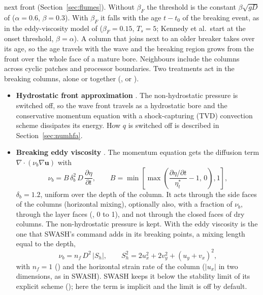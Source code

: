 next front (Section~\ref{sec:flumes}).
Without $\beta_F$ the threshold is the constant $\beta\sqrt{gD}$ of
\citet{smit2013} ($\alpha = 0.6$, $\beta = 0.3$). With $\beta_F$ it falls with
the age $t-t_0$ of the breaking event, as in the eddy-viscosity model of
\citet{kennedy2000} ($\beta_F = 0.15$, $T_s = 5$; Kennedy et al.\ start at the
onset threshold, $\beta = \alpha$). A column that joins next to an older
breaker takes over its age, so the age travels with the wave and the
breaking region grows from the front over the whole face of a mature bore.
Neighbours include the columns across cyclic patches and processor
boundaries. Two treatments act in
the breaking columns, alone or together (,
 or ).
\begin{itemize}[nosep]
  \item \textbf{Hydrostatic front approximation} \citep{smit2013}. The
        non-hydrostatic pressure is switched off, so the wave front travels as
        a hydrostatic bore and the conservative momentum equation with a
        shock-capturing (TVD) convection scheme dissipates its energy. How $q$
        is switched off is described in Section~\ref{sec:numhfa}.
  \item \textbf{Breaking eddy viscosity} \citep{kennedy2000}. The momentum
        equation gets the diffusion term $\nabla\cdot(\nu_b\nabla\bm{u})$ with
        \begin{equation}
        \nu_b = B\,\delta_b^2\,D\,\frac{\partial\eta}{\partial t},\qquad
        B = \min\!\left[\max\!\left(\frac{\partial\eta/\partial t}{\eta_t^*}-1,\,0\right),1\right],
        \label{eq:nub}
        \end{equation}
        $\delta_b = 1.2$, uniform over the depth of the column. It acts through
        the side faces of the columns (horizontal mixing), optionally also,
        with a fraction of $\nu_b$, through the layer faces
        (, 0 to 1), and not through the closed faces
        of dry columns. The non-hydrostatic pressure is kept. With
         the eddy viscosity is the one that SWASH's
         command adds in its breaking points, a mixing length
        equal to the depth,
        \begin{equation}
        \nu_b = n_f\,D^2\,|S_h|,\qquad
        S_h^2 = 2u_x^2 + 2v_y^2 + (u_y + v_x)^2,
        \label{eq:nudepth}
        \end{equation}
        with $n_f = 1$ () and the horizontal strain rate of
        the column ($|u_x|$ in two dimensions, as in SWASH). SWASH keeps it
        below the stability limit of its explicit scheme
        (); here the term is implicit and the limit is
        off by default.
\end{itemize}
